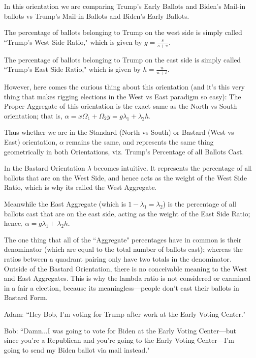 \documentclass[preprint,13pt]{elsarticle}
\begin{document}
In this orientation we are comparing Trump's Early Ballots and Biden's Mail-in ballots vs Trump's Mail-in Ballots and Biden's Early Ballots.

The percentage of ballots belonging to Trump on the west side is simply called ``Trump's West Side Ratio," which is given by $g=\frac{s}{s+v}$.

The percentage of ballots belonging to Trump on the east side is simply called ``Trump's East Side Ratio," which is given by $h=\frac{u}{u+t}$.

However, here comes the curious thing about this orientation (and it's this very thing that makes rigging elections in the West vs East paradigm so easy): The Proper Aggregate of this orientation is the exact same as the North vs South orientation; that is, $\alpha=x\Omega_{1}+\Omega_{2}y=g\lambda_{1}+\lambda_{2}h$.

Thus whether we are in the Standard (North vs South) or Bastard (West vs East) orientation, $\alpha$ remains the same, and represents the same thing geometrically in both Orientations, viz. Trump's Percentage of all Ballots Cast.

In the Bastard Orientation $\lambda$ becomes intuitive. It represents the percentage of all ballots that are on the West Side, and hence acts as the weight of the West Side Ratio, which is why its called the West Aggregate. 

Meanwhile the East Aggregate (which is $1-\lambda_{1}=\lambda_{2}$) is the percentage of all ballots cast that are on the east side, acting as the weight of the East Side Ratio; hence, $\alpha=g\lambda_{1}+\lambda_{2}h$.

The one thing that all of the ``Aggregate" percentages have in common is their denominator (which are equal to the total number of ballots cast); whereas the ratios between a quadrant pairing only have two totals in the denominator.
\newpage
Outside of the Bastard Orientation, there is no conceivable meaning to the West and East Aggregates. This is why the lambda ratio is not considered or examined in a fair a election, because its meaningless---people don't cast their ballots in Bastard Form.

Adam: ``Hey Bob, I'm voting for Trump after work at the Early Voting Center."

Bob: ``Damn...I was going to vote for Biden at the Early Voting Center---but since you're a Republican and you're going to the Early Voting Center---I'm going to send my Biden ballot via mail instead."
\end{document}
